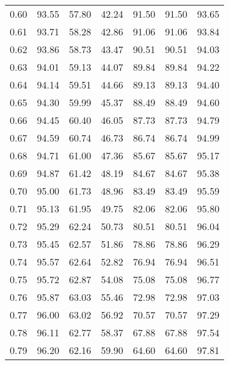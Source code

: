 \begin{tabular}{|c|c|c|c|c|c|c|}
      0.60 &     93.55 &     57.80 &      42.24 &   91.50 &      91.50 &         93.65 \\
      0.61 &     93.71 &     58.28 &      42.86 &   91.06 &      91.06 &         93.84 \\
      0.62 &     93.86 &     58.73 &      43.47 &   90.51 &      90.51 &         94.03 \\
      0.63 &     94.01 &     59.13 &      44.07 &   89.84 &      89.84 &         94.22 \\
      0.64 &     94.14 &     59.51 &      44.66 &   89.13 &      89.13 &         94.40 \\
      0.65 &     94.30 &     59.99 &      45.37 &   88.49 &      88.49 &         94.60 \\
      0.66 &     94.45 &     60.40 &      46.05 &   87.73 &      87.73 &         94.79 \\
      0.67 &     94.59 &     60.74 &      46.73 &   86.74 &      86.74 &         94.99 \\
      0.68 &     94.71 &     61.00 &      47.36 &   85.67 &      85.67 &         95.17 \\
      0.69 &     94.87 &     61.42 &      48.19 &   84.67 &      84.67 &         95.38 \\
      0.70 &     95.00 &     61.73 &      48.96 &   83.49 &      83.49 &         95.59 \\
      0.71 &     95.13 &     61.95 &      49.75 &   82.06 &      82.06 &         95.80 \\
      0.72 &     95.29 &     62.24 &      50.73 &   80.51 &      80.51 &         96.04 \\
      0.73 &     95.45 &     62.57 &      51.86 &   78.86 &      78.86 &         96.29 \\
      0.74 &     95.57 &     62.64 &      52.82 &   76.94 &      76.94 &         96.51 \\
      0.75 &     95.72 &     62.87 &      54.08 &   75.08 &      75.08 &         96.77 \\
      0.76 &     95.87 &     63.03 &      55.46 &   72.98 &      72.98 &         97.03 \\
      0.77 &     96.00 &     63.02 &      56.92 &   70.57 &      70.57 &         97.29 \\
      0.78 &     96.11 &     62.77 &      58.37 &   67.88 &      67.88 &         97.54 \\
      0.79 &     96.20 &     62.16 &      59.90 &   64.60 &      64.60 &         97.81 \\

\end{tabular}
